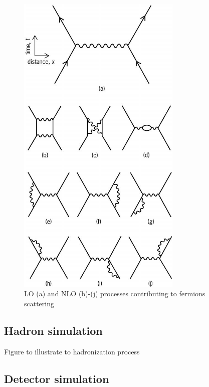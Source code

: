 \begin{figure}[!Hhtbp]
  \begin{center}
    \includegraphics[width=0.7\textwidth]{figs/Feynman_diagrams.jpg}
    \caption{LO (a) and NLO (b)-(j) processes contributing to fermions scattering}
    \label{fig:LOpNLO}
  \end{center}
\end{figure}

\subsection{Hadron simulation}
\label{sec:hadron}

\begin{TOINCLUDE}Figure to illustrate to hadronization process\end{TOINCLUDE}

\subsection{Detector simulation}
\label{sec:detector}

